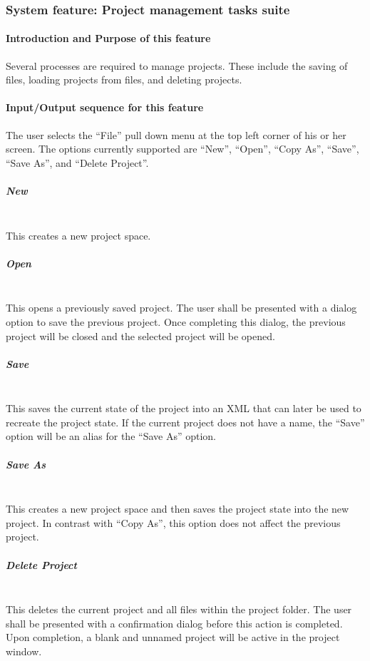 \documentclass[twoside,letterpaper]{article}
\begin{document}
\clearpage






\clearpage


\subsubsection[System feature: [Project management tasks suite]{\bfseries System feature: Project management tasks suite}

\paragraph[\ Introduction/Purpose of this feature] {\bfseries Introduction and Purpose of this feature}
{
Several processes are required to manage projects. These include the saving of files, loading projects from files, and deleting projects.}


\paragraph[Input/Output sequence for this feature]{\rmfamily\bfseries Input/Output sequence for this feature}
{
The user selects the ``File'' pull down menu at the top left corner of his or her screen. The options currently supported are ``New'', ``Open'', ``Copy As'', ``Save'', ``Save As'', and ``Delete Project''. }

\subparagraph{New}
{
\\ This creates a new project space. }

\subparagraph{Open}
{
\\ This opens a previously saved project. The user shall be presented with a dialog option to save the previous project. Once completing this dialog, the previous project will be closed and the selected project will be opened.}

\subparagraph{Save}
{
\\ This saves the current state of the project into an XML that can later be used to recreate the project state. If the current project does not have a name, the ``Save'' option will be an alias for the ``Save As'' option.}

\subparagraph{Save As}
{
\\ This creates a new project space and then saves the project state into the new project. In contrast with ``Copy As'', this option does not affect the previous project. }

\subparagraph{Delete Project}
{
\\ This deletes the current project and all files within the project folder. The user shall be presented with a confirmation dialog before this action is completed. Upon completion, a blank and unnamed project will be active in the project window. }
\end{document}
